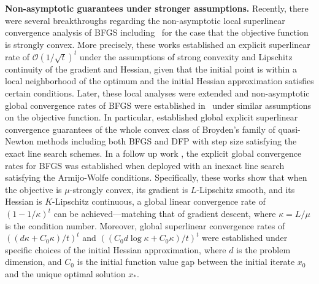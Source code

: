 \documentclass[11pt,letterpaper]{article}
\newcommand\0{{\Vector{0}}}
\newcommand\1{{\Vector{1}}}
\numberwithin{assumption}{section}
\numberwithin{definition}{section}
\numberwithin{theorem}{section}
\numberwithin{remark}{section}
\begin{document}
\textbf{Non-asymptotic guarantees under stronger assumptions.} Recently, there were several breakthroughs regarding the non-asymptotic local superlinear convergence analysis of BFGS including~\cite{rodomanov2020rates,rodomanov2020ratesnew,ye2023towards,qiujiang2020quasinewton} for the case that the objective function is strongly convex. More precisely, these works established an explicit superlinear rate of $\mathcal{O}({1}/{\sqrt{t}})^t$ under the assumptions of strong convexity and Lipschitz continuity of the gradient and Hessian, given that the initial point is within a local neighborhood of the optimum and the initial Hessian approximation satisfies certain conditions. Later, these local analyses were extended and non-asymptotic global convergence rates of BFGS were established in~\cite{krutikov2023convergence,antonglobal,jin2024non,qiujiang2024quasinewton} under similar assumptions on the objective function. In particular, \cite{jin2024non} established global explicit superlinear convergence guarantees of the whole convex class of Broyden's family of quasi-Newton methods including both BFGS and DFP with step size satisfying the exact line search schemes. In a follow up work \cite{qiujiang2024quasinewton}, the explicit global convergence rates for BFGS was established when deployed with an inexact line search satisfying the Armijo-Wolfe conditions. Specifically, these works show that when the objective is $\mu$-strongly convex, its gradient is $L$-Lipschitz smooth, and its Hessian is $K$-Lipschitz continuous, a global linear convergence rate of $(1 - {1}/{\kappa})^t$ can be achieved—matching that of gradient descent, where $\kappa = L/\mu$ is the condition number. Moreover, global superlinear convergence rates of $({(d\kappa + C_0\kappa)}/{t})^t$ and $({(C_0 d\log{\kappa} + C_0\kappa)}/{t})^t$ were established under specific choices of the initial Hessian approximation, where $d$ is the problem dimension,  and $C_0$ is the initial function value gap between the initial iterate $x_0$ and the unique optimal solution $x_*$.

\end{document}
